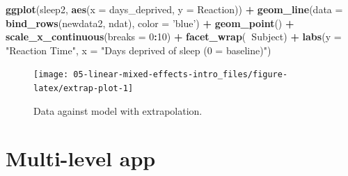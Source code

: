 \documentclass[]{book}
\newenvironment{Shaded}{\begin{snugshade}}{\end{snugshade}}
\newcommand{\CommentTok}[1]{\textcolor[rgb]{0.56,0.35,0.01}{\textit{#1}}}
\newcommand{\DataTypeTok}[1]{\textcolor[rgb]{0.13,0.29,0.53}{#1}}
\newcommand{\DecValTok}[1]{\textcolor[rgb]{0.00,0.00,0.81}{#1}}
\newcommand{\KeywordTok}[1]{\textcolor[rgb]{0.13,0.29,0.53}{\textbf{#1}}}
\newcommand{\NormalTok}[1]{#1}
\newcommand{\OperatorTok}[1]{\textcolor[rgb]{0.81,0.36,0.00}{\textbf{#1}}}
\newcommand{\StringTok}[1]{\textcolor[rgb]{0.31,0.60,0.02}{#1}}
\begin{document}
\begin{Shaded}
\end{Shaded}

\begin{Shaded}
\begin{Highlighting}[]
\KeywordTok{ggplot}\NormalTok{(sleep2, }\KeywordTok{aes}\NormalTok{(}\DataTypeTok{x =}\NormalTok{ days_deprived, }\DataTypeTok{y =}\NormalTok{ Reaction)) }\OperatorTok{+}
\StringTok{  }\KeywordTok{geom_line}\NormalTok{(}\DataTypeTok{data =} \KeywordTok{bind_rows}\NormalTok{(newdata2, ndat),}
            \DataTypeTok{color =} \StringTok{'blue'}\NormalTok{) }\OperatorTok{+}
\StringTok{  }\KeywordTok{geom_point}\NormalTok{() }\OperatorTok{+}
\StringTok{  }\KeywordTok{scale_x_continuous}\NormalTok{(}\DataTypeTok{breaks =} \DecValTok{0}\OperatorTok{:}\DecValTok{10}\NormalTok{) }\OperatorTok{+}
\StringTok{  }\KeywordTok{facet_wrap}\NormalTok{(}\OperatorTok{~}\NormalTok{Subject) }\OperatorTok{+}
\StringTok{  }\KeywordTok{labs}\NormalTok{(}\DataTypeTok{y =} \StringTok{"Reaction Time"}\NormalTok{, }\DataTypeTok{x =} \StringTok{"Days deprived of sleep (0 = baseline)"}\NormalTok{)}
\end{Highlighting}
\end{Shaded}

\begin{figure}

{\centering \texttt{[image: 05-linear-mixed-effects-intro\_files/figure-latex/extrap-plot-1]} 

}

\caption{Data against model with extrapolation.}\label{fig:extrap-plot}
\end{figure}

\hypertarget{multi-level-app}{%
\section{Multi-level app}\label{multi-level-app}}
\end{document}
